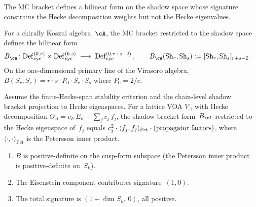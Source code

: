 The MC bracket defines a bilinear form on the shadow space
whose signature constrains the Hecke decomposition weights but
not the Hecke eigenvalues.

\begin{definition}%
\label{def:shadow-bracket-form}%
%
For a chirally Koszul algebra~$\cA$, the MC bracket restricted
to the shadow space defines the bilinear form
\begin{equation}\label{eq:shadow-bracket-form}
 B_\cA\colon
 \mathrm{Def}_{\mathrm{cyc}}^{(0,r)} \times
 \mathrm{Def}_{\mathrm{cyc}}^{(0,s)}
 \;\longrightarrow\;
 \mathrm{Def}_{\mathrm{cyc}}^{(0,r+s-2)}\,,
 \qquad
 B_\cA(\operatorname{Sh}_r, \operatorname{Sh}_s)
 := [\operatorname{Sh}_r, \operatorname{Sh}_s]_{r+s-2}\,.
\end{equation}
On the one-dimensional primary line of the Virasoro algebra,
$B(S_r, S_s) = r \cdot s \cdot P_0 \cdot S_r \cdot S_s$ where
$P_0 = 2/c$.
\end{definition}

\begin{theorem}%
\label{thm:petersson-identification}%
\ClaimStatusProvedHere%
%
Assume the finite-Hecke-span stability criterion and the
chain-level shadow bracket projection to Hecke eigenspaces. For a
lattice VOA $V_\Lambda$ with Hecke decomposition
$\Theta_\Lambda = c_E\,E_k + \sum_j c_j\,f_j$, the shadow
bracket form~$B_\cA$ restricted to the Hecke eigenspace
of~$f_j$ equals
$c_j^2 \cdot \langle f_j, f_j \rangle_{\mathrm{Pet}} \cdot
\textup{(propagator factors)}$,
where $\langle\cdot,\cdot\rangle_{\mathrm{Pet}}$ is the
Petersson inner product.
\begin{enumerate}[label=\textup{(\roman*)}]
\item $B$ is positive-definite on the cusp-form subspace
 \textup{(}the Petersson inner product is positive-definite
 on~$S_k$\textup{)}.
\item The Eisenstein component contributes
 signature~$(1,0)$.
\item The total signature is
 $(1 + \dim S_k,\, 0)$, all positive.
\end{enumerate}
\end{theorem}

